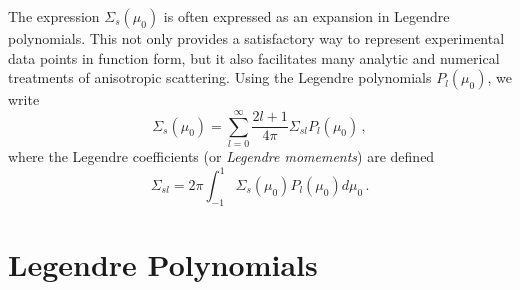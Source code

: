 The expression $\Sigma_s(\mu_0)$ is often expressed as an expansion in Legendre polynomials.  This not only provides a satisfactory way to represent experimental data points in function form, but it also facilitates many analytic and numerical treatments of anisotropic scattering.  Using the Legendre polynomials $P_l(\mu_0)$, we write
\begin{equation}
 \Sigma_s(\mu_0) = \sum^{\infty}_{l=0} \frac{2l+1}{4\pi} \Sigma_{sl}P_{l}(\mu_0) \, , 
 \label{eq:scatterkernel}
\end{equation}
where the Legendre coefficients (or \textit{Legendre momements}) are defined
\begin{equation}
 \Sigma_{sl} = 2\pi \int^{1}_{-1} \Sigma_s(\mu_0) P_l(\mu_0) d\mu_0 \, .
 \label{eq:scattermoment}
\end{equation}

\section*{Legendre Polynomials}


